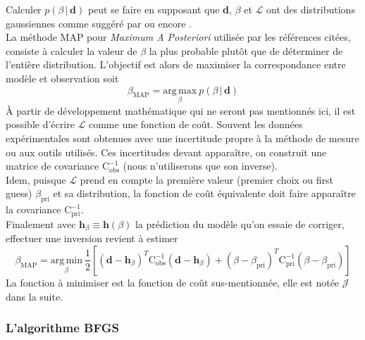 \documentclass[a4paper,12pt]{article}
\newcommand{\bepar}[1]{
	\left( #1 \right)  
}
\newcommand{\becro}[1]{
	\left[ #1 \right]  
}
\newcommand{\covobs}{\text{C}^{-1}_{\text{obs}}}
\newcommand{\covpri}{\text{C}^{-1}_{\text{pri}}}
\newcommand{\bmap}{\beta_{\text{MAP}}}
\newcommand\bk{\color{black}}
\newcommand\dsb{\color{dsb}}
\numberwithin{equation}{section} %
\begin{document}
Calculer $p\bepar{\beta\,|\,\textbf{d}}$ peut se faire en supposant que \textbf{d}, $\beta$ et $\mathcal{L}$ ont des distributions gaussiennes comme suggéré par \citep{parish2016paradigm} \citep{aster2011parameter} ou encore \citep{tarantola2005inverse}.\\
La méthode MAP pour \textit{Maximum A Posteriori} utilisée par les références citées, consiste à calculer la valeur de $\beta$ la plus probable plutôt que de déterminer de l'entière distribution. L'objectif est alors de maximiser la correspondance entre modèle et observation soit 
\begin{equation}
\beta_{\text{MAP}} = \underset{\beta}{\text{arg}\, \text{max}} \ p\bepar{\beta\,|\,\textbf{d}} \label{bmap}
\end{equation}
À partir de développement mathématique qui ne seront pas mentionnés ici, il est possible d'écrire $\mathcal{L}$ comme une fonction de coût. Souvent les données expérimentales sont obtenues avec une incertitude propre à la méthode de mesure ou aux outils utilisés. Ces incertitudes devant apparaître, on construit une matrice de covariance $\covobs$ (nous n'utiliserons que son inverse). \\
Idem, puisque $\mathcal{L}$ prend en compte la première valeur (premier choix ou first guess) $\beta_{\text{pri}}$ et sa distribution, la fonction de coût équivalente doit faire apparaître la covariance $\covpri$.\\
Finalement avec $\textbf{h}_\beta \equiv \textbf{h}(\beta)$ la prédiction du modèle qu'on essaie de corriger, effectuer une inversion revient à estimer 
\begin{equation}
\bmap = \underset{\beta}{\text{arg}\, \text{min}}\ \frac{1}{2}\becro{\bepar{\textbf{d} - \textbf{h}_\beta}^T \covobs \bepar{\textbf{d} - \textbf{h}_\beta} + \bepar{\beta - \beta_{\text{pri}}}^T \covpri  \bepar{\beta - \beta_{\text{pri}}}} \label{bmapJ}
\end{equation}
La fonction à minimiser est la fonction de coût sus-mentionnée, elle est notée $\mathcal{J}$ dans la suite.

\dsb \subsubsection{L'algorithme BFGS} \bk
\end{document}

